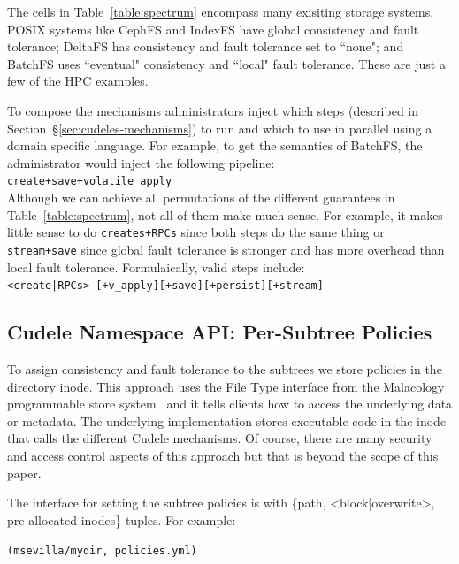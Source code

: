 The cells in Table~\ref{table:spectrum} encompass many exisiting storage
systems. POSIX systems like CephFS and IndexFS have global consistency and
fault tolerance; DeltaFS has consistency and fault tolerance set to ``none";
and BatchFS uses ``eventual" consistency and ``local" fault tolerance. These
are just a few of the HPC examples.  

To compose the mechanisms administrators inject which steps (described in
Section~\S\ref{sec:cudeles-mechanisms}) to run and which to use in parallel
using a domain specific language. For example, to get the semantics of BatchFS,
the administrator would inject the following pipeline:\\

\noindent \texttt{create+save+volatile apply}\\

Although we can achieve all permutations of the different guarantees in
Table~\ref{table:spectrum}, not all of them make much sense. For example, it
makes little sense to do \texttt{creates+RPCs} since both steps do the same
thing or \texttt{stream+save} since global fault tolerance is stronger and has
more overhead than local fault tolerance.  Formulaically, valid steps
include:\\

\noindent \texttt{<create|RPCs> [+v\_apply][+save][+persist][+stream]}

\subsection{Cudele Namespace API: Per-Subtree Policies}

To assign consistency and fault tolerance to the subtrees we store policies in
the directory inode. This approach uses the File Type interface from the
Malacology programmable store system~\cite{} and it tells clients how to access
the underlying data or metadata. The underlying implementation stores
executable code in the inode that calls the different Cudele mechanisms. Of
course, there are many security and access control aspects of this approach but
that is beyond the scope of this paper.

The interface for setting the subtree policies is with \{path,
<block|overwrite>, pre-allocated inodes\} tuples. For example:

\texttt{(msevilla/mydir, policies.yml)}


